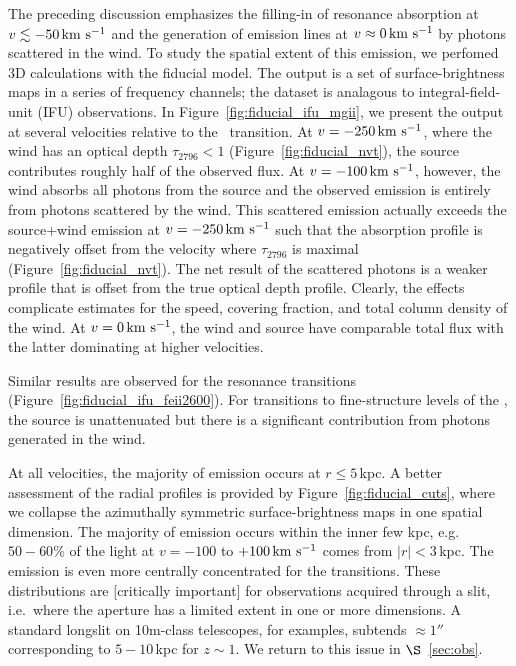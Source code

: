 \documentclass[12pt,preprint]{aastex}
\begin{document}
The preceding discussion emphasizes the filling-in of resonance absorption at $v
\lesssim -50 \, {\rm km~s^{-1}}$ and the generation of emission lines at $v \approx
0 \, {\rm km~s^{-1}}$ by photons scattered in the wind.  To study the spatial
extent of this emission, we perfomed 3D calculations with the fiducial
model.  The output is a set of surface-brightness maps in a series of
frequency channels; the
dataset is analagous to integral-field-unit (IFU) observations.  In
Figure~\ref{fig:fiducial_ifu_mgii}, we present the output 
at several velocities relative to the \mgiia\
transition. At $v = -250 \, {\rm km~s^{-1}}$, where the wind has an optical
depth $\tau_{2796} < 1$ (Figure~\ref{fig:fiducial_nvt}),
the source contributes roughly half of the observed flux.  
At $v=-100 \, {\rm km~s^{-1}}$, however, the
wind absorbs all photons from the source and the observed emission is
entirely from photons scattered by the wind.  This scattered emission
actually exceeds the source+wind emission at 
$v = -250 \, {\rm km~s^{-1}}$ such
that the absorption profile is
negatively offset from the velocity where $\tau_{2796}$ is maximal
(Figure~\ref{fig:fiducial_nvt}).
The net result of the scattered photons is
a weaker  profile that is offset from the true optical
depth profile.  Clearly, the effects complicate estimates for the
speed, covering fraction, and total column density of the wind.  At $v
= 0 \, {\rm km~s^{-1}}$, the wind and source have comparable total flux with the
latter dominating at higher velocities.  

Similar results are observed for the  resonance
transitions (Figure~\ref{fig:fiducial_ifu_feii2600}).
For transitions to fine-structure levels of the \aconfig, the source
is unattenuated but there is a significant contribution from photons
generated in the wind. 

At all velocities, the majority of emission occurs at $r \le 5$\,kpc.
A better assessment of the radial profiles is provided by
Figure~\ref{fig:fiducial_cuts}, where we collapse the 
azimuthally symmetric surface-brightness maps in
one spatial dimension.  The majority of
 emission occurs within the inner few kpc, e.g.\ $50-60\%$
of the light at $v=-100$ to $+100 \, {\rm km~s^{-1}}$
comes from $|r| < 3$\,kpc.
The emission
is even more centrally concentrated for the  transitions.
These distributions are [critically important] for observations
acquired through a slit, i.e.\ where the aperture has a limited extent
in one or more dimensions.  A standard longslit on 10m-class
telescopes, for examples, subtends $\approx 1''$ corresponding to
$5-10$\,kpc for $z \sim 1$.    We return to this issue in
$\S$~\ref{sec:obs}. 
\end{document}
